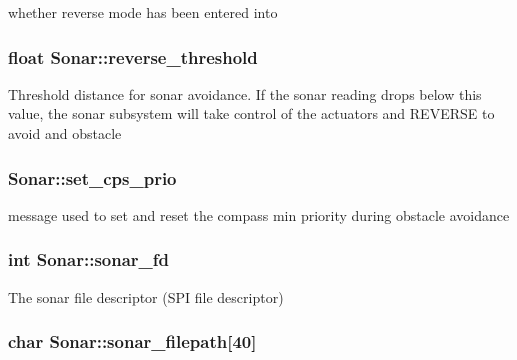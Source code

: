 whether reverse mode has been entered into \hypertarget{classSonar_a27714390fb769905062ae587d8b2f112}{
\subsubsection[{reverse\-\_\-threshold}]{\setlength{\rightskip}{0pt plus 5cm}float Sonar\-::reverse\-\_\-threshold\hspace{0.3cm}{\ttfamily [protected]}}}\label{classSonar_a27714390fb769905062ae587d8b2f112}
Threshold distance for sonar avoidance. If the sonar reading drops below this value, the sonar subsystem will take control of the actuators and R\-E\-V\-E\-R\-S\-E to avoid and obstacle \hypertarget{classSonar_adc1ca3536457074b9ba2ca5880154ce6}{
\subsubsection[{set\-\_\-cps\-\_\-prio}]{ Sonar\-::set\-\_\-cps\-\_\-prio\hspace{0.3cm}{\ttfamily [protected]}}}\label{classSonar_adc1ca3536457074b9ba2ca5880154ce6}
message used to set and reset the compass min priority during obstacle avoidance \hypertarget{classSonar_a4799c8b328d7735f7e6d62d741340c6c}{
\subsubsection[{sonar\-\_\-fd}]{\setlength{\rightskip}{0pt plus 5cm}int Sonar\-::sonar\-\_\-fd\hspace{0.3cm}{\ttfamily [protected]}}}\label{classSonar_a4799c8b328d7735f7e6d62d741340c6c}
The sonar file descriptor (S\-P\-I file descriptor) \hypertarget{classSonar_a7db9106da9a50d06b5f25c35f799abe5}{
\subsubsection[{sonar\-\_\-filepath}]{\setlength{\rightskip}{0pt plus 5cm}char Sonar\-::sonar\-\_\-filepath\mbox{[}40\mbox{]}\hspace{0.3cm}{\ttfamily [protected]}}}\label{classSonar_a7db9106da9a50d06b5f25c35f799abe5}
